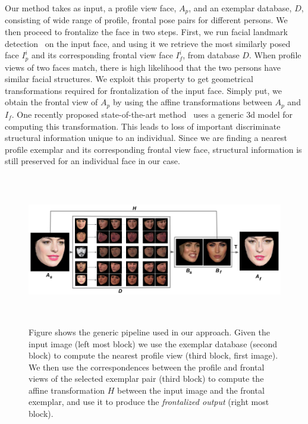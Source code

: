 Our method takes as input, a profile view face, $A_p$, and an exemplar database, $D$, consisting of
wide range of profile, frontal pose pairs for different persons. We then proceed to frontalize
the face in two steps. First, we run facial landmark
detection~\cite{kazemi2014one} on the input face, and using it we retrieve the most similarly posed face 
$I^i_p$ and its corresponding frontal view face $I^i_f$, from
database $D$. When profile views of two faces match, there is high likelihood that the two persons
have similar facial structures. We exploit this property to get geometrical transformations required
for frontalization of the input face.
Simply put, we obtain the frontal view of $A_p$ by using the affine transformations between $A_p$
and $I_f$. One recently proposed state-of-the-art method~\cite{DBLP:journals/corr/HassnerHPE14} uses a generic {\sc 3d}
model for computing this transformation. This leads to loss of important discriminate structural information
unique to an individual. Since we are finding a nearest profile exemplar and its corresponding
frontal view face, structural information is still preserved for an individual face in our case.
                 
\begin{figure}
\includegraphics[width =16cm,height=6.6cm]{front/figures/Method_Pipeline.png}
\caption{Figure shows the generic pipeline used in our approach. Given the input image (left most
block) we use the exemplar database (second block) to compute the nearest profile view (third block,
first image). We then use the correspondences between the profile and frontal views of the
selected exemplar pair (third block) to compute the affine transformation $H$ between the input
image and the frontal exemplar, and use it to produce the \emph{frontalized output} (right most block).}
\label{fig:method_pipeline}
\end{figure}

